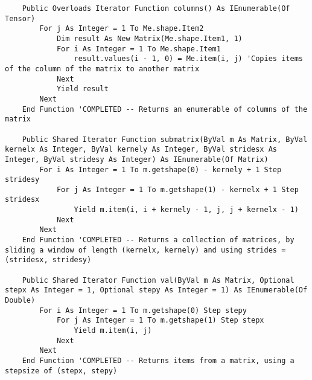 \begin{verbatim}
    Public Overloads Iterator Function columns() As IEnumerable(Of Tensor)
        For j As Integer = 1 To Me.shape.Item2
            Dim result As New Matrix(Me.shape.Item1, 1)
            For i As Integer = 1 To Me.shape.Item1
                result.values(i - 1, 0) = Me.item(i, j) 'Copies items of the column of the matrix to another matrix
            Next
            Yield result
        Next
    End Function 'COMPLETED -- Returns an enumerable of columns of the matrix

    Public Shared Iterator Function submatrix(ByVal m As Matrix, ByVal kernelx As Integer, ByVal kernely As Integer, ByVal stridesx As Integer, ByVal stridesy As Integer) As IEnumerable(Of Matrix)
        For i As Integer = 1 To m.getshape(0) - kernely + 1 Step stridesy
            For j As Integer = 1 To m.getshape(1) - kernelx + 1 Step stridesx
                Yield m.item(i, i + kernely - 1, j, j + kernelx - 1)
            Next
        Next
    End Function 'COMPLETED -- Returns a collection of matrices, by sliding a window of length (kernelx, kernely) and using strides = (stridesx, stridesy)

    Public Shared Iterator Function val(ByVal m As Matrix, Optional stepx As Integer = 1, Optional stepy As Integer = 1) As IEnumerable(Of Double)
        For i As Integer = 1 To m.getshape(0) Step stepy
            For j As Integer = 1 To m.getshape(1) Step stepx
                Yield m.item(i, j)
            Next
        Next
    End Function 'COMPLETED -- Returns items from a matrix, using a stepsize of (stepx, stepy)
    
\end{verbatim}
